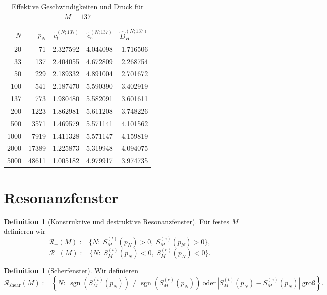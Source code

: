 \documentclass[a4paper,12pt]{article}
\theoremstyle{definition}
\newtheorem{definition}[satz]{Definition}
\numberwithin{equation}{section}
\begin{document}
	\begin{table}[htbp]
		\centering
		\caption{Effektive Geschwindigkeiten und Druck für \(M=137\)}
		\begin{tabular}{@{}rrrrr@{}}
			\toprule
			\(N\) & \(p_N\) & \(\tilde c_t^{(N;137)}\) & \(\tilde c_e^{(N;137)}\) & \(\widehat D_H^{(N;137)}\) \\
			\midrule
			20   & 71    & 2.327592 & 4.044098 & 1.716506 \\
			33   & 137   & 2.404055 & 4.672809 & 2.268754 \\
			50   & 229   & 2.189332 & 4.891004 & 2.701672 \\
			100  & 541   & 2.187470 & 5.590390 & 3.402919 \\
			137  & 773   & 1.980480 & 5.582091 & 3.601611 \\
			200  & 1223  & 1.862981 & 5.611208 & 3.748226 \\
			500  & 3571  & 1.469579 & 5.571141 & 4.101562 \\
			1000 & 7919  & 1.411328 & 5.571147 & 4.159819 \\
			2000 & 17389 & 1.225873 & 5.319948 & 4.094075 \\
			5000 & 48611 & 1.005182 & 4.979917 & 3.974735 \\
			\bottomrule
		\end{tabular}
	\end{table}
	
	\section{Resonanzfenster}
	
	\begin{definition}[Konstruktive und destruktive Resonanzfenster]
		Für festes \(M\) definieren wir
		\[
		\mathcal R_+(M)
		:=
		\{N:\; S_M^{(t)}(p_N)>0,\;S_M^{(e)}(p_N)>0\},
		\]
		\[
		\mathcal R_-(M)
		:=
		\{N:\; S_M^{(t)}(p_N)<0,\;S_M^{(e)}(p_N)<0\}.
		\]
	\end{definition}
	
	\begin{definition}[Scherfenster]
		Wir definieren
		\[
		\mathcal R_{\mathrm{shear}}(M)
		:=
		\left\{N:\;
		\operatorname{sgn}(S_M^{(t)}(p_N))\neq \operatorname{sgn}(S_M^{(e)}(p_N))
		\ \text{oder}\
		|S_M^{(t)}(p_N)-S_M^{(e)}(p_N)|\ \text{groß}
		\right\}.
		\]
	\end{definition}
	
\end{document}
